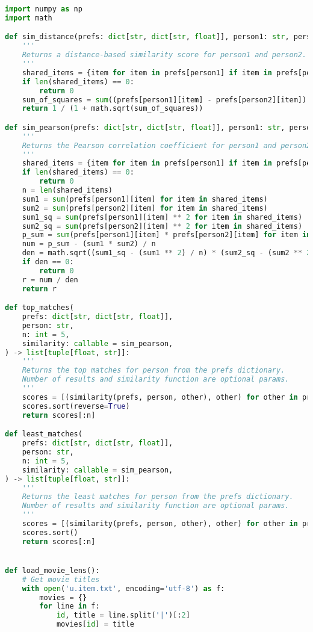 \documentclass[12pt]{article}
\begin{document}
\begin{lstlisting}[language=Python, caption=Finding users with my preferences.] 
import numpy as np
import math

def sim_distance(prefs: dict[str, dict[str, float]], person1: str, person2: str) -> float:
    '''
    Returns a distance-based similarity score for person1 and person2.
    '''
    shared_items = {item for item in prefs[person1] if item in prefs[person2]}
    if len(shared_items) == 0:
        return 0
    sum_of_squares = sum((prefs[person1][item] - prefs[person2][item]) ** 2 for item in shared_items)
    return 1 / (1 + math.sqrt(sum_of_squares))

def sim_pearson(prefs: dict[str, dict[str, float]], person1: str, person2: str) -> float:
    '''
    Returns the Pearson correlation coefficient for person1 and person2.
    '''
    shared_items = {item for item in prefs[person1] if item in prefs[person2]}
    if len(shared_items) == 0:
        return 0
    n = len(shared_items)
    sum1 = sum(prefs[person1][item] for item in shared_items)
    sum2 = sum(prefs[person2][item] for item in shared_items)
    sum1_sq = sum(prefs[person1][item] ** 2 for item in shared_items)
    sum2_sq = sum(prefs[person2][item] ** 2 for item in shared_items)
    p_sum = sum(prefs[person1][item] * prefs[person2][item] for item in shared_items)
    num = p_sum - (sum1 * sum2) / n
    den = math.sqrt((sum1_sq - (sum1 ** 2) / n) * (sum2_sq - (sum2 ** 2) / n))
    if den == 0:
        return 0
    r = num / den
    return r

def top_matches(
    prefs: dict[str, dict[str, float]],
    person: str,
    n: int = 5,
    similarity: callable = sim_pearson,
) -> list[tuple[float, str]]:
    '''
    Returns the top matches for person from the prefs dictionary. 
    Number of results and similarity function are optional params.
    '''
    scores = [(similarity(prefs, person, other), other) for other in prefs if other != person]
    scores.sort(reverse=True)
    return scores[:n]

def least_matches(
    prefs: dict[str, dict[str, float]],
    person: str,
    n: int = 5,
    similarity: callable = sim_pearson,
) -> list[tuple[float, str]]:
    '''
    Returns the least matches for person from the prefs dictionary. 
    Number of results and similarity function are optional params.
    '''
    scores = [(similarity(prefs, person, other), other) for other in prefs if other != person]
    scores.sort()
    return scores[:n]


def load_movie_lens():
    # Get movie titles
    with open('u.item.txt', encoding='utf-8') as f:
        movies = {}
        for line in f:
            id, title = line.split('|')[:2]
            movies[id] = title


\end{lstlisting}
\end{document}
